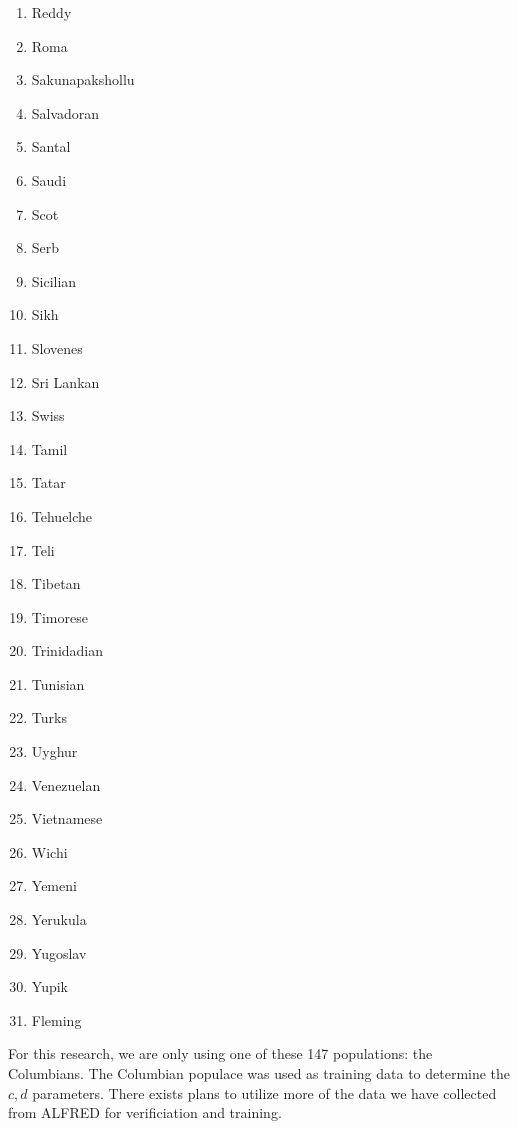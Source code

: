 {\begin{multicols}{4}
\begin{enumerate}
            \item Reddy
            \item Roma
            \item Sakunapakshollu
            \item Salvadoran
            \item Santal
            \item Saudi
            \item Scot
            \item Serb
            \item Sicilian
            \item Sikh
            \item Slovenes
            \item Sri Lankan
            \item Swiss
            \item Tamil
            \item Tatar
            \item Tehuelche
            \item Teli
            \item Tibetan
            \item Timorese
            \item Trinidadian
            \item Tunisian
            \item Turks
            \item Uyghur
            \item Venezuelan
            \item Vietnamese
            \item Wichi
            \item Yemeni
            \item Yerukula
            \item Yugoslav
            \item Yupik
            \item Fleming
        \end{enumerate}
    \end{multicols}
}

For this research, we are only using one of these 147 populations: the Columbians.
The Columbian populace was used as training data to determine the $c, d$ parameters.
There exists plans to utilize more of the data we have collected from ALFRED for verificiation and training.
